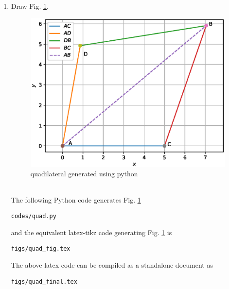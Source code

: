 \begin{enumerate}[label=\thesection.\arabic*.,ref=\thesection.\theenumi]
\item Draw Fig. \ref{fig:quad2}.\\
\begin{figure}[!ht]
\centering
\includegraphics[width=\columnwidth]{./figs/quad.eps}
\caption{quadilateral generated using python}
\label{fig:quad2}
\end{figure} \\
\solution The  following Python code generates Fig. \ref{fig:quad2}

\begin{lstlisting}
codes/quad.py
\end{lstlisting}

and the equivalent latex-tikz code generating Fig. \ref{fig:quad2} is 
\begin{lstlisting}
figs/quad_fig.tex
\end{lstlisting}
%
The above latex code can be compiled as a standalone document as
\begin{lstlisting}
figs/quad_final.tex
\end{lstlisting}
\end{enumerate}


%
